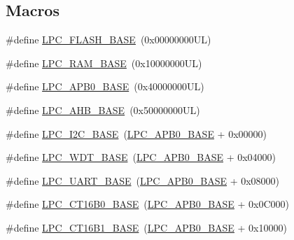 \subsection*{Macros}
\begin{DoxyCompactItemize}
\item 
\#define \hyperlink{group___l_p_c11xx___definitions_ga7d7417b6cd6c6975fa03de03920d27e8}{L\+P\+C\+\_\+\+F\+L\+A\+S\+H\+\_\+\+B\+A\+SE}~(0x00000000\+U\+L)
\item 
\#define \hyperlink{group___l_p_c11xx___definitions_ga9782814ad6434f200b65440d2ac01c2a}{L\+P\+C\+\_\+\+R\+A\+M\+\_\+\+B\+A\+SE}~(0x10000000\+U\+L)
\item 
\#define \hyperlink{group___l_p_c11xx___definitions_ga55cab996c3594a0f4cc459ec8e10daea}{L\+P\+C\+\_\+\+A\+P\+B0\+\_\+\+B\+A\+SE}~(0x40000000\+U\+L)
\item 
\#define \hyperlink{group___l_p_c11xx___definitions_ga8e0d25ffe3428ed27f963e83089046a8}{L\+P\+C\+\_\+\+A\+H\+B\+\_\+\+B\+A\+SE}~(0x50000000\+U\+L)
\item 
\#define \hyperlink{group___l_p_c11xx___definitions_ga9e53652929424015ade23fe30e1d022b}{L\+P\+C\+\_\+\+I2\+C\+\_\+\+B\+A\+SE}~(\hyperlink{group___l_p_c11xx___definitions_ga55cab996c3594a0f4cc459ec8e10daea}{L\+P\+C\+\_\+\+A\+P\+B0\+\_\+\+B\+A\+SE} + 0x00000)
\item 
\#define \hyperlink{group___l_p_c11xx___definitions_ga02a30b0be4672972c3af9e5aebdcfea1}{L\+P\+C\+\_\+\+W\+D\+T\+\_\+\+B\+A\+SE}~(\hyperlink{group___l_p_c11xx___definitions_ga55cab996c3594a0f4cc459ec8e10daea}{L\+P\+C\+\_\+\+A\+P\+B0\+\_\+\+B\+A\+SE} + 0x04000)
\item 
\#define \hyperlink{group___l_p_c11xx___definitions_ga50ba023c2b0046a5be8b1b236effeb35}{L\+P\+C\+\_\+\+U\+A\+R\+T\+\_\+\+B\+A\+SE}~(\hyperlink{group___l_p_c11xx___definitions_ga55cab996c3594a0f4cc459ec8e10daea}{L\+P\+C\+\_\+\+A\+P\+B0\+\_\+\+B\+A\+SE} + 0x08000)
\item 
\#define \hyperlink{group___l_p_c11xx___definitions_ga663c7a2d9c286efce1fd9c90c0068dac}{L\+P\+C\+\_\+\+C\+T16\+B0\+\_\+\+B\+A\+SE}~(\hyperlink{group___l_p_c11xx___definitions_ga55cab996c3594a0f4cc459ec8e10daea}{L\+P\+C\+\_\+\+A\+P\+B0\+\_\+\+B\+A\+SE} + 0x0\+C000)
\item 
\#define \hyperlink{group___l_p_c11xx___definitions_ga5f33f849b010785defa0105cf6eb87f1}{L\+P\+C\+\_\+\+C\+T16\+B1\+\_\+\+B\+A\+SE}~(\hyperlink{group___l_p_c11xx___definitions_ga55cab996c3594a0f4cc459ec8e10daea}{L\+P\+C\+\_\+\+A\+P\+B0\+\_\+\+B\+A\+SE} + 0x10000)
\item 

\end{DoxyCompactItemize}
